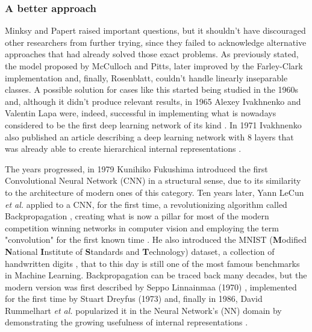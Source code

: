 \documentclass[class=report, crop=false, a4paper, 12pt]{standalone}
\begin{document}
\subsubsection{A better approach}
Minksy and Papert raised important questions, but it shouldn't have discouraged other researchers from further trying, since they failed to acknowledge alternative approaches that had already solved those exact problems. As previously stated, the model proposed by McCulloch and Pitts, later improved by the Farley-Clark implementation and, finally, Rosenblatt, couldn't handle linearly inseparable classes. A possible solution for cases like this started being studied in the 1960s \autocite{josephContributionsPerceptronTheory1960,rosenblattPrinciplesNeurodynamicsPerceptrons1962} and, although it didn't produce relevant results, in 1965 Alexey Ivakhnenko and Valentin Lapa \autocite{ivakhnenkoCyberneticPredictingDevices} were, indeed, successful in implementing what is nowadays considered to be the first deep learning network of its kind \autocite{schmidhuberDeepLearningNeural2015}. In 1971 Ivakhnenko also published an article describing a deep learning network with 8 layers that was already able to create hierarchical internal representations \autocite{4308320}.
\par The years progressed, in 1979 Kunihiko Fukushima introduced the first Convolutional Neural Network (CNN) in a structural sense, due to its similarity to the architecture of modern ones of this category. Ten years later, Yann LeCun \textit{et al.} applied to a CNN, for the first time, a revolutionizing algorithm called Backpropagation  \autocite{6795724}, creating what is now a pillar for most of the modern competition winning networks in computer vision \autocite{schmidhuberDeepLearningNeural2015} and employing the term "convolution" for the first known time \autocite{liSurveyConvolutionalNeural2022}. He also introduced the MNIST (\textbf{M}odified \textbf{N}ational \textbf{I}nstitute of \textbf{S}tandards and \textbf{T}echnology) dataset, a collection of handwritten digits \autocite{lecunGradientBasedLearningApplied1998}, that to this day is still one of the most famous benchmarks in Machine Learning. Backpropagation can be traced back many decades, but the modern version was first described by Seppo Linnainmaa (1970) \autocite{linnainmaa1970representation}, implemented for the first time by Stuart Dreyfus (1973) \autocite{Dreyfus1973383} and, finally in 1986, David Rummelhart \textit{et al.} popularized it in the Neural Network's (NN) domain by demonstrating the growing usefulness of internal representations \autocite{rumelhart1986learning}.
\end{document}
